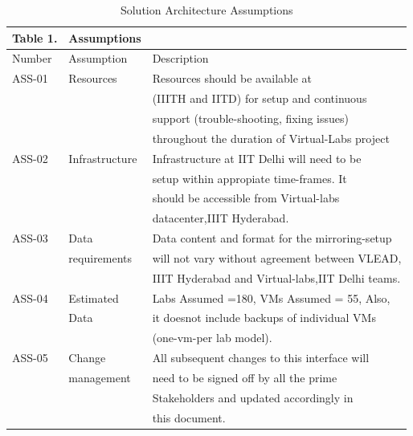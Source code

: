 \documentclass[11pt]{article}
\begin{document}
\begin{table}[H]
\caption{\label{tbl:Assumptions}Solution Architecture Assumptions}
\begin{center}
\begin{tabular}{lll}
\hline
 Table 1.  &  Assumptions     &                                                    \\
\hline
 Number    &  Assumption      &  Description                                       \\
\hline
 ASS-01    &  Resources       &  Resources should be available at                  \\
           &                  &  (IIITH and IITD) for setup and continuous         \\
           &                  &  support (trouble-shooting, fixing issues)         \\
           &                  &  throughout the duration of Virtual-Labs project   \\
 ASS-02    &  Infrastructure  &  Infrastructure at IIT Delhi will need to be       \\
           &                  &  setup within appropiate time-frames. It           \\
           &                  &  should be accessible from Virtual-labs            \\
           &                  &  datacenter,IIIT Hyderabad.                        \\
 ASS-03    &  Data            &  Data content and format for the mirroring-setup   \\
           &  requirements    &  will not vary without agreement between VLEAD,    \\
           &                  &  IIIT Hyderabad and Virtual-labs,IIT Delhi teams.  \\
 ASS-04    &  Estimated       &  Labs Assumed =180, VMs Assumed = 55, Also,        \\
           &  Data            &  it doesnot include backups of individual VMs      \\
           &                  &  (one-vm-per lab model).                           \\
 ASS-05    &  Change          &  All subsequent changes to this interface will     \\
           &  management      &  need to be signed off by all the prime            \\
           &                  &  Stakeholders and updated accordingly in           \\
           &                  &  this document.                                    \\
\hline
\end{tabular}
\end{center}
\end{table}
\end{document}
